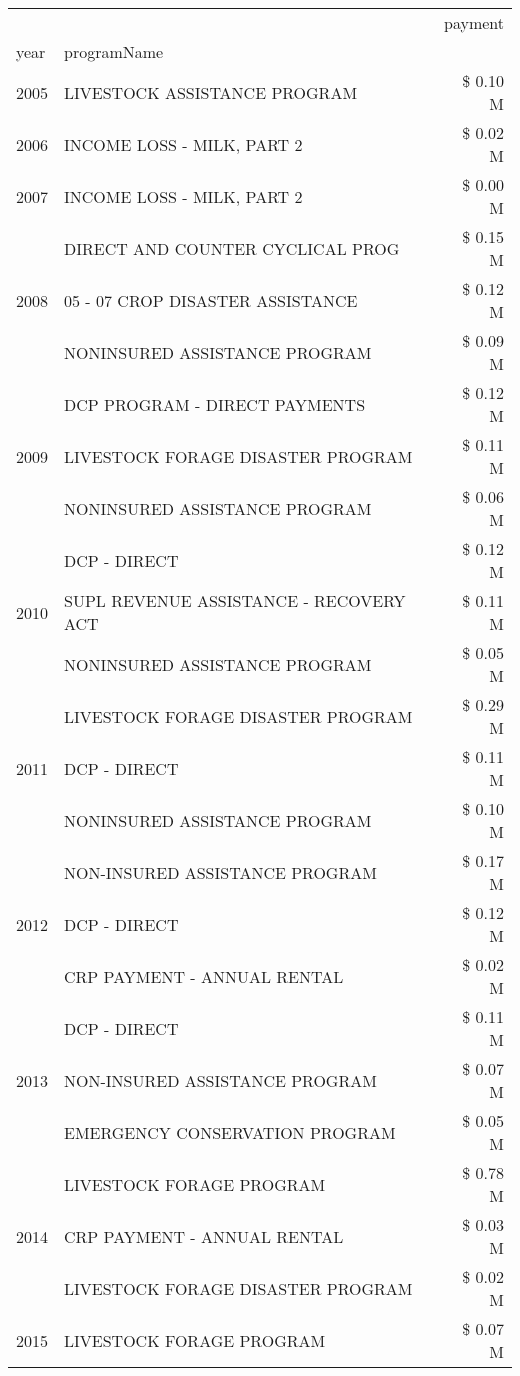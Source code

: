 \begin{tabular}{llr}
\toprule
 &  & payment \\
year & programName &  \\
\midrule
2005 & LIVESTOCK ASSISTANCE PROGRAM & \$ 0.10 M \\
\cline{1-3}
2006 & INCOME LOSS - MILK, PART 2 & \$ 0.02 M \\
\cline{1-3}
2007 & INCOME LOSS - MILK, PART 2 & \$ 0.00 M \\
\cline{1-3}
\multirow[t]{3}{*}{2008} & DIRECT AND COUNTER CYCLICAL PROG & \$ 0.15 M \\
 & 05 - 07 CROP DISASTER ASSISTANCE & \$ 0.12 M \\
 & NONINSURED ASSISTANCE PROGRAM & \$ 0.09 M \\
\cline{1-3}
\multirow[t]{3}{*}{2009} & DCP PROGRAM - DIRECT PAYMENTS & \$ 0.12 M \\
 & LIVESTOCK FORAGE DISASTER  PROGRAM & \$ 0.11 M \\
 & NONINSURED ASSISTANCE PROGRAM & \$ 0.06 M \\
\cline{1-3}
\multirow[t]{3}{*}{2010} & DCP - DIRECT & \$ 0.12 M \\
 & SUPL REVENUE ASSISTANCE - RECOVERY ACT & \$ 0.11 M \\
 & NONINSURED ASSISTANCE PROGRAM & \$ 0.05 M \\
\cline{1-3}
\multirow[t]{3}{*}{2011} & LIVESTOCK FORAGE DISASTER PROGRAM & \$ 0.29 M \\
 & DCP - DIRECT & \$ 0.11 M \\
 & NONINSURED ASSISTANCE PROGRAM & \$ 0.10 M \\
\cline{1-3}
\multirow[t]{3}{*}{2012} & NON-INSURED ASSISTANCE PROGRAM & \$ 0.17 M \\
 & DCP - DIRECT & \$ 0.12 M \\
 & CRP PAYMENT - ANNUAL RENTAL & \$ 0.02 M \\
\cline{1-3}
\multirow[t]{3}{*}{2013} & DCP - DIRECT & \$ 0.11 M \\
 & NON-INSURED ASSISTANCE PROGRAM & \$ 0.07 M \\
 & EMERGENCY CONSERVATION PROGRAM & \$ 0.05 M \\
\cline{1-3}
\multirow[t]{3}{*}{2014} & LIVESTOCK FORAGE PROGRAM & \$ 0.78 M \\
 & CRP PAYMENT - ANNUAL RENTAL & \$ 0.03 M \\
 & LIVESTOCK FORAGE DISASTER PROGRAM & \$ 0.02 M \\
\cline{1-3}
\multirow[t]{3}{*}{2015} & LIVESTOCK FORAGE PROGRAM & \$ 0.07 M \\

\end{tabular}
